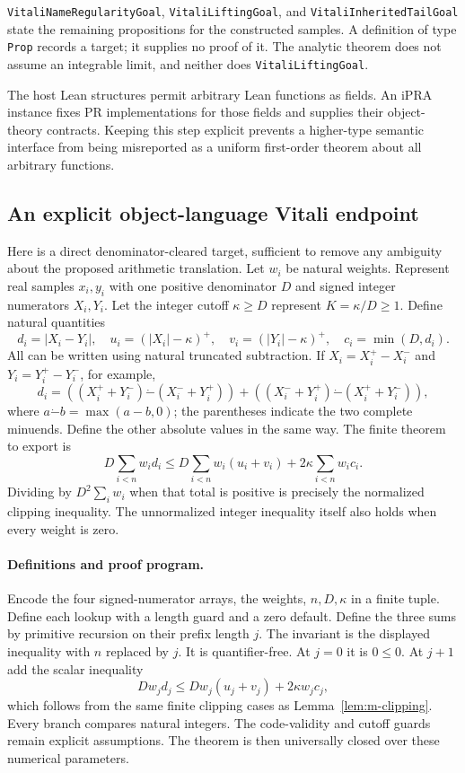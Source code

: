 \texttt{VitaliNameRegularityGoal}, \texttt{VitaliLiftingGoal}, and
\texttt{VitaliInheritedTailGoal} state the remaining propositions for the
constructed samples. A definition of type \texttt{Prop} records a target;
it supplies no proof of it. The analytic theorem does not assume an
integrable limit, and neither does \texttt{VitaliLiftingGoal}.

The host Lean structures permit arbitrary Lean functions as fields.
An iPRA instance fixes PR implementations for those fields and supplies
their object-theory contracts. Keeping this step explicit prevents a
higher-type semantic interface from being misreported as a uniform
first-order theorem about all arbitrary functions.

\subsection{An explicit object-language Vitali endpoint}

Here is a direct denominator-cleared target, sufficient to remove any
ambiguity about the proposed arithmetic translation. Let $w_i$ be natural
weights. Represent real samples $x_i,y_i$ with one positive denominator
$D$ and signed integer numerators $X_i,Y_i$. Let the integer cutoff
$\kappa\ge D$ represent $K=\kappa/D\ge1$. Define natural quantities
\[
 d_i=|X_i-Y_i|,\quad
 u_i=(|X_i|-\kappa)^+,\quad v_i=(|Y_i|-\kappa)^+,\quad
 c_i=\min(D,d_i).
\]
All can be written using natural truncated subtraction. If
$X_i=X_i^+-X_i^-$ and $Y_i=Y_i^+-Y_i^-$, for example,
\[
 d_i=((X_i^++Y_i^-)\mathbin{\dot-}(X_i^-+Y_i^+))
      +((X_i^-+Y_i^+)\mathbin{\dot-}(X_i^++Y_i^-)),
\]
where $a\mathbin{\dot-}b=\max(a-b,0)$; the parentheses indicate the two
complete minuends. Define the other absolute values in the same way.
The finite theorem to export is
\begin{equation}\label{eq:object-vitali}
 D\sum_{i<n}w_id_i
 \le D\sum_{i<n}w_i(u_i+v_i)
       +2\kappa\sum_{i<n}w_ic_i.
\end{equation}
Dividing by $D^2\sum_iw_i$ when that total is positive is precisely the
normalized clipping inequality. The unnormalized integer inequality
itself also holds when every weight is zero.

\paragraph{Definitions and proof program.}
Encode the four signed-numerator arrays, the weights, $n,D,\kappa$ in a
finite tuple. Define each lookup with a length guard and a zero default.
Define the three sums by primitive recursion on their prefix length $j$.
The invariant is the displayed inequality with $n$ replaced by $j$.
It is quantifier-free. At $j=0$ it is $0\le0$. At $j+1$ add the scalar
inequality
\[
 Dw_jd_j\le Dw_j(u_j+v_j)+2\kappa w_jc_j,
\]
which follows from the same finite clipping cases as
Lemma~\ref{lem:m-clipping}. Every branch compares natural integers.
The code-validity and cutoff guards remain explicit assumptions.
The theorem is then universally closed over these numerical parameters.

